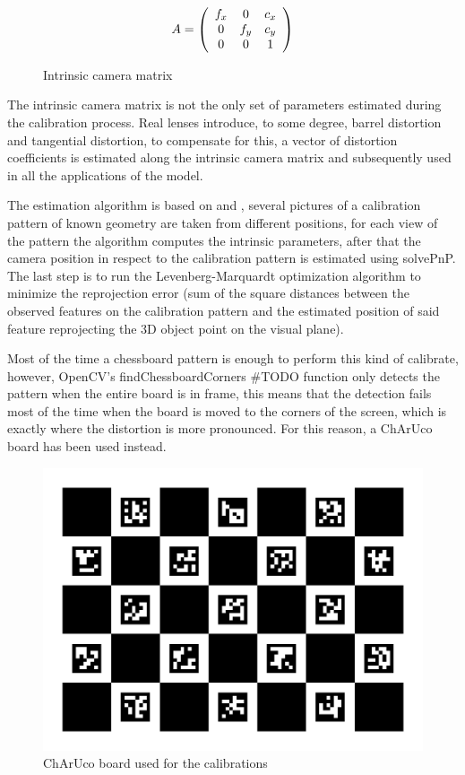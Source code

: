 \begin{figure}[h]
\caption{Intrinsic camera matrix}
\label{fig:camera_matrix}
\[A = \left (
  \begin{array}{ c c c}
  f_x & 0   & c_x \\
   0  & f_y & c_y \\
   0  & 0   & 1 \\
  \end{array}
\right )\]
\end{figure}


The intrinsic camera matrix is not the only set of parameters estimated during the calibration process. Real lenses introduce, to some degree, barrel distortion and tangential distortion, to compensate for this, a vector of distortion coefficients is estimated along the intrinsic camera matrix and subsequently used in all the applications of the model.\newline


The estimation algorithm is based on \cite{888718} and \cite{matlab}, several pictures of a calibration pattern of known geometry are taken from different positions, for each view of the pattern the algorithm computes the intrinsic parameters, after that the camera position in respect to the calibration pattern is estimated using solvePnP\cite{opencvsolvepnp}. The last step is to run the Levenberg-Marquardt optimization algorithm to minimize the reprojection error (sum of the square distances between the observed features on the calibration pattern and the estimated position of said feature reprojecting the 3D object point on the visual plane).

Most of the time a chessboard pattern is enough to perform this kind of calibrate, however, OpenCV's findChessboardCorners \#TODO function only detects the pattern when the entire board is in frame, this means that the detection fails most of the time when the board is moved to the corners of the screen, which is exactly where the distortion is more pronounced. For this reason, a ChArUco board has been used instead.

\begin{figure}[h]
  \centering
  \includegraphics[scale=0.15]{figures/charucoboard.png}
  \caption{ChArUco board used for the calibrations}
  \label{img:ch_board}
\end{figure}

